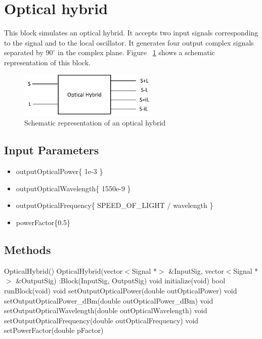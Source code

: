 \clearpage

\section{Optical hybrid}

This block simulates an optical hybrid. It accepts two input signals corresponding to the signal and to the local oscillator. It generates four output complex signals separated by $90^\circ$ in the complex plane. Figure ~\ref{opticalhybrid} shows a schematic representation of this block.

\begin{figure}[h]
	\centering\includegraphics[width=0.6\textwidth]{../homodyne_receiver/figures/optical_hybrid.png}
	\caption{Schematic representation of an optical hybrid}\label{opticalhybrid}
\end{figure}

\subsection*{Input Parameters}

\begin{itemize}
	\item outputOpticalPower\{ 1e-3 \} 
	\item outputOpticalWavelength\{ 1550e-9 \}
	\item outputOpticalFrequency\{ SPEED\_OF\_LIGHT / wavelength \}
	\item powerFactor\{0.5\}
\end{itemize}

\subsection*{Methods}
 
OpticalHybrid() {}
\bigbreak
OpticalHybrid(vector$<$Signal *$>$ \&InputSig, vector$<$Signal *$>$ \&OutputSig) :Block(InputSig, OutputSig) {}
\bigbreak
void initialize(void)
\bigbreak
bool runBlock(void)
\bigbreak
void setOutputOpticalPower(double outOpticalPower)
\bigbreak
void setOutputOpticalPower\_dBm(double outOpticalPower\_dBm)
\bigbreak
void setOutputOpticalWavelength(double outOpticalWavelength)
\bigbreak
void setOutputOpticalFrequency(double outOpticalFrequency) 
\bigbreak
void setPowerFactor(double pFactor)

